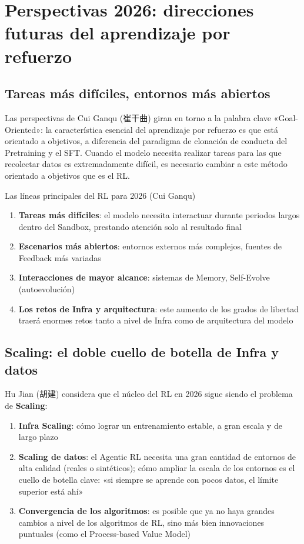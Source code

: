 \documentclass[a4paper]{article}
\begin{document}
\section{Perspectivas 2026: direcciones futuras del aprendizaje por refuerzo}

\subsection{Tareas más difíciles, entornos más abiertos}

Las perspectivas de Cui Ganqu (崔干曲) giran en torno a la palabra clave «Goal-Oriented»: la característica esencial del aprendizaje por refuerzo es que está orientado a objetivos, a diferencia del paradigma de clonación de conducta del Pretraining y el SFT. Cuando el modelo necesita realizar tareas para las que recolectar datos es extremadamente difícil, es necesario cambiar a este método orientado a objetivos que es el RL.

\begin{importantbox}{Las líneas principales del RL para 2026 (Cui Ganqu)}
\begin{enumerate}
    \item \textbf{Tareas más difíciles}: el modelo necesita interactuar durante periodos largos dentro del Sandbox, prestando atención solo al resultado final
    \item \textbf{Escenarios más abiertos}: entornos externos más complejos, fuentes de Feedback más variadas
    \item \textbf{Interacciones de mayor alcance}: sistemas de Memory, Self-Evolve (autoevolución)
    \item \textbf{Los retos de Infra y arquitectura}: este aumento de los grados de libertad traerá enormes retos tanto a nivel de Infra como de arquitectura del modelo
\end{enumerate}
\end{importantbox}

\subsection{Scaling: el doble cuello de botella de Infra y datos}

Hu Jian (胡建) considera que el núcleo del RL en 2026 sigue siendo el problema de \textbf{Scaling}:

\begin{enumerate}
    \item \textbf{Infra Scaling}: cómo lograr un entrenamiento estable, a gran escala y de largo plazo
    \item \textbf{Scaling de datos}: el Agentic RL necesita una gran cantidad de entornos de alta calidad (reales o sintéticos); cómo ampliar la escala de los entornos es el cuello de botella clave: «si siempre se aprende con pocos datos, el límite superior está ahí»
    \item \textbf{Convergencia de los algoritmos}: es posible que ya no haya grandes cambios a nivel de los algoritmos de RL, sino más bien innovaciones puntuales (como el Process-based Value Model)
\end{enumerate}
\end{document}
